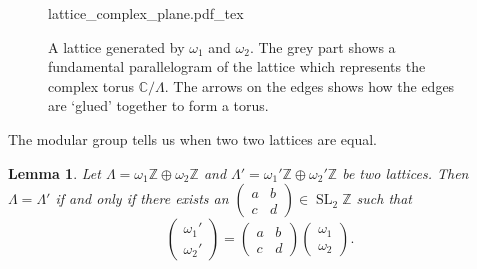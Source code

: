 \documentclass[titlepage,a4paper]{article}
\newcommand{\incfig}[1]{%
	\def\svgwidth{\columnwidth}
	{#1.pdf_tex}
}
\theoremstyle{theoremdd}
\newtheorem{lemma}[theorem]{Lemma}
\theoremstyle{definitiondd}
\theoremstyle{remarkdd}
\newcommand{\Z}{\mathbb{Z}}
\newcommand{\C}{\mathbb{C}}
\DeclareMathOperator{\SL}{SL}
\begin{document}
\begin{figure}[h]
	\centering
	\incfig{lattice_complex_plane}
	\caption{A lattice generated by $\omega_1$ and $\omega_2$. The grey part shows a fundamental parallelogram of the lattice which represents the complex torus $\C / \Lambda$. The arrows on the edges shows how the edges are `glued' together to form a torus.} \label{fig:complex_torus}
\end{figure}

The modular group tells us when two two lattices are equal. 
\begin{lemma}\label{lem:equality_of_lattices}
	Let $\Lambda = \omega_1\Z \oplus \omega_2\Z$ and $\Lambda' = \omega_1'\Z \oplus \omega_2'\Z$ be two lattices. 
	Then $\Lambda = \Lambda'$ if and only if there exists an $\begin{pmatrix} a & b \\ c& d \end{pmatrix} \in \SL_2\Z$ such that \[
	\begin{pmatrix} \omega_1' \\ \omega_2' \end{pmatrix}  = 
	\begin{pmatrix} a & b \\ c& d \end{pmatrix} 
	\begin{pmatrix} \omega_1 \\ \omega_2 \end{pmatrix} 
	.\] 
\end{lemma}
\end{document}
